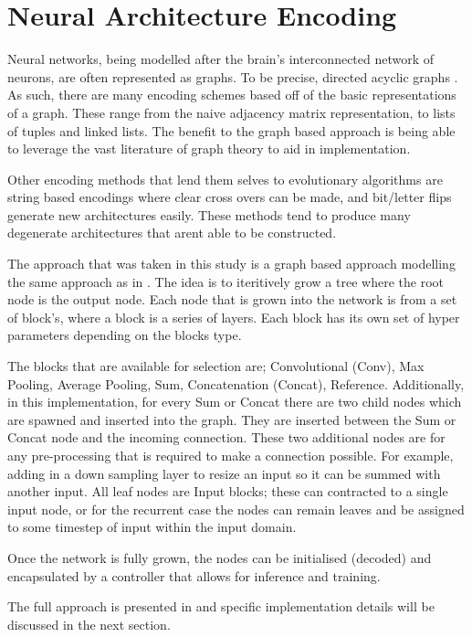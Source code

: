 
\section{Neural Architecture Encoding}
    \label{sec:encoding}

    Neural networks, being modelled after the brain's interconnected network of neurons, are often represented as graphs. To be precise, directed acyclic graphs \autocite{Fekiac2011}. As such, there are many encoding schemes based off of the basic representations of a graph. These range from the naive adjacency matrix representation, to lists of tuples and linked lists. The benefit to the graph based approach is being able to leverage the vast literature of graph theory to aid in implementation.

    Other encoding methods that lend them selves to evolutionary algorithms are string based encodings \autocite{Fekiac2011} where clear cross overs can be made, and bit/letter flips generate new architectures easily. These methods tend to produce many degenerate architectures that arent able to be constructed.

The approach that was taken in this study is a graph based approach modelling the same approach as in \autocite{Irwin-Harris2019}. The idea is to iteritively grow a tree where the root node is the output node. Each node that is grown into the network is from a set of block's, where a block is a series of layers. Each block has its own set of hyper parameters depending on the blocks type.

The blocks that are available for selection are;  Convolutional (Conv), Max Pooling, Average Pooling, Sum, Concatenation (Concat), Reference. Additionally, in this implementation, for every Sum or Concat there are two child nodes which are spawned and inserted into the graph. They are inserted between the Sum or Concat node and the incoming connection. These two additional nodes are for any pre-processing that is required to make a connection possible. For example, adding in a down sampling layer to resize an input so it can be summed with another input. All leaf nodes are Input blocks; these can contracted to a single input node, or for the recurrent case the nodes can remain leaves and be assigned to some timestep of input within the input domain.

Once the network is fully grown, the nodes can be initialised (decoded) and encapsulated by a controller that allows for inference and training.


The full approach is presented in \autocite{Irwin-Harris2019} and specific implementation details will be discussed in the next section.






